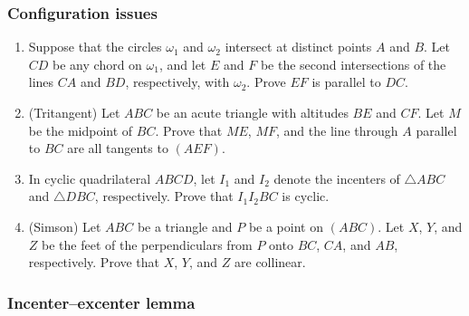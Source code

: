 \documentclass[11pt,paper=letter]{scrartcl}
\begin{document}
\subsubsection*{Configuration issues}

\begin{enumerate}
  \item Suppose that the circles $\omega_1$ and $\omega_2$ intersect at distinct points $A$ and $B$. Let $CD$ be any chord on $\omega_1$, and let $E$ and $F$ be the second intersections of the lines $CA$ and $BD$, respectively, with $\omega_2$. Prove $EF$ is parallel to $DC$. %

  \item (Tritangent) Let $ABC$ be an acute triangle with altitudes $BE$ and $CF$. Let $M$ be the midpoint of $BC$. Prove that $ME$, $MF$, and the line through $A$ parallel to $BC$ are all tangents to $(AEF)$.

  \item In cyclic quadrilateral $ABCD$, let $I_1$ and $I_2$ denote the incenters of $\triangle ABC$ and $\triangle DBC$, respectively. Prove that $I_1I_2BC$ is cyclic.

  \item (Simson) Let $ABC$ be a triangle and $P$ be a point on $(ABC)$. Let $X$, $Y$, and $Z$ be the feet of the perpendiculars from $P$ onto $BC$, $CA$, and $AB$, respectively. Prove that $X$, $Y$, and $Z$ are collinear.
\end{enumerate}

\subsubsection*{Incenter--excenter lemma}
\end{document}
